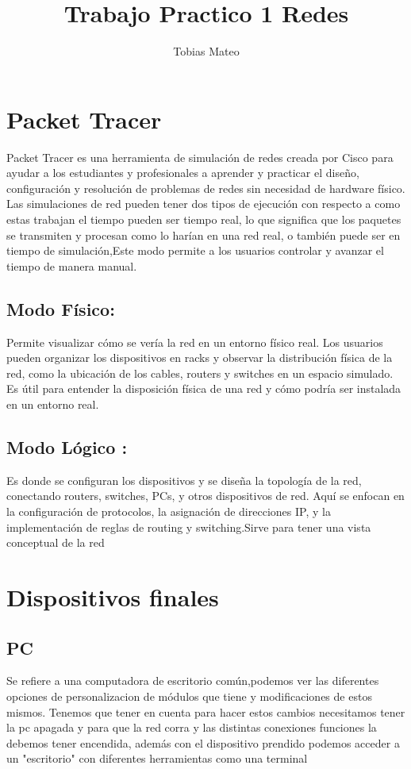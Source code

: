 \documentclass{article}
\title{Trabajo Practico 1 Redes}
\author{Tobias Mateo}
\affil{\texttt{tobiasmateo46@gmail.com} }
\begin{document}
\maketitle

\section{Packet Tracer}

Packet Tracer es una herramienta de simulación de redes creada por Cisco para ayudar a los estudiantes y profesionales a aprender y practicar el diseño, configuración y resolución de problemas de redes sin necesidad de hardware físico. Las simulaciones de red pueden tener dos tipos de ejecución con respecto a como estas trabajan el tiempo pueden ser tiempo real, lo que significa que los paquetes se transmiten y procesan como lo harían en una red real, o también puede ser en tiempo de simulación,Este modo permite a los usuarios controlar y avanzar el tiempo de manera manual. 
   

\subsection{Modo Físico:  }

Permite visualizar cómo se vería la red en un entorno físico real. Los usuarios pueden organizar los dispositivos en racks y observar la distribución física de la red, como la ubicación de los cables, routers y switches en un espacio simulado. Es útil para entender la disposición física de una red y cómo podría ser instalada en un entorno real. 

 \subsection{Modo Lógico :  }

Es donde se configuran los dispositivos y se diseña la topología de la red, conectando routers, switches, PCs, y otros dispositivos de red. Aquí se enfocan en la configuración de protocolos, la asignación de direcciones IP, y la implementación de reglas de routing y switching.Sirve para tener una vista conceptual de la red




\section{Dispositivos finales}
\subsection{PC}
Se refiere a una computadora de escritorio común,podemos  ver las diferentes opciones de personalizacion de módulos que tiene y modificaciones de estos mismos. Tenemos que tener en cuenta para hacer estos cambios necesitamos tener la pc apagada y para que la red corra y las distintas conexiones funciones la debemos tener encendida, además con el dispositivo prendido podemos acceder a un "escritorio" con diferentes herramientas como una terminal
\end{document}
